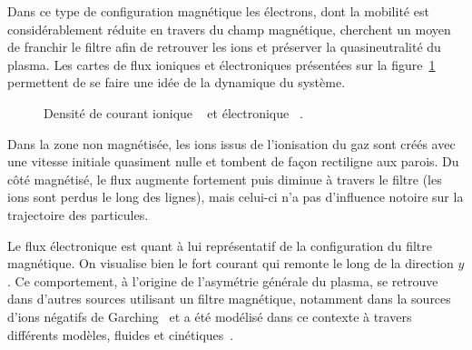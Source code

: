 \begin{refsection}
Dans ce type de configuration
magnétique les électrons, dont la mobilité est considérablement réduite en
travers du champ magnétique, cherchent un moyen de franchir le filtre afin de
retrouver les ions et préserver la quasineutralité du plasma. Les cartes de flux
ioniques et électroniques présentées sur la figure~\ref{4-PegasesCarteFlux}
permettent de se faire une idée de la dynamique du système. 

\begin{figure}[!htbp]
  \centering
    \caption{Densité de courant ionique ~
    et électronique ~.}
    \label{4-PegasesCarteFlux}
\end{figure}

Dans la zone non
magnétisée, les ions issus de l'ionisation du gaz sont créés avec une vitesse
initiale quasiment nulle et tombent de façon rectiligne aux parois. Du côté
magnétisé, le flux augmente fortement puis diminue à travers le filtre (les
ions sont perdus le long des lignes), mais celui-ci n'a pas d'influence notoire
sur la trajectoire des particules.

Le flux électronique est quant à lui représentatif de la configuration du filtre
magnétique. On visualise bien le fort courant qui
remonte le long de la direction $y$. Ce comportement, à l'origine de l'asymétrie
générale du plasma, se retrouve dans d'autres sources utilisant un filtre
magnétique, notamment dans la sources d'ions négatifs de
Garching~\parencite{Fantz} et a été modélisé dans ce contexte à travers
différents modèles, fluides et cinétiques~\parencite{PIC2D,PIC3D,MAGMA}.


\end{refsection}
